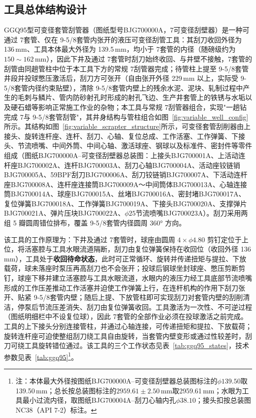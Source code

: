 \subsection{工具总体结构设计}
\label{kebianjingguaguan}
GGQ95型可变径套管刮管器（图纸型号BJG700000A，7\inch 可变径刮壁器）是一种可通过 7\inch 套管、仅在 9-5/8\inch 套管内张开的液压可变径刮管工具：其刮刀收回外径为 136\,mm、工具本体最大外径为 139.5\,mm，均小于 7\inch 套管的内径（随磅级约为 $150\sim162$\,mm），因此下井及通过 7\inch 套管时刮刀始终收回、与井壁不接触，7\inch 套管的刮管由同趟管柱中位于本工具下方的常规 7\inch 刮管器完成；待管柱上提至 9-5/8\inch 套管井段并投球憋压激活后，刮刀方可张开（自由张开外径 229\,mm 以上，实际受 9-5/8\inch 套管内径约束贴壁），清除 9-5/8\inch 套管内壁上的残余水泥、泥块、轧制过程中产生的毛刺与鳞片、管内防砂射孔时形成的射孔飞边、生产井套管上的铁锈与水垢以及硬石蜡等影响正常施工作业的杂物；本工具与常规 7\inch 刮管器组合，实现"一趟钻完成 7\inch 与 9-5/8\inch 套管刮管"，其井身结构与管柱组合如图~\ref{fig:variable_well_config}所示。其结构如图~\ref{fig:variable_scrapter_structure}所示，可变径套管刮削器由上接头、旋转连杆座、连杆、刮刀、心轴、复位总成、工作活塞、工作弹簧、下接头、节流喷嘴、中间外筒、中间心轴、激活球座、钢球以及标准件、密封件等零件组成（图纸BJG700000A--可变径刮壁器总装图：上接头BJG700001A、上活动连杆座BJG700002A、连杆BJG700003A、刮刀心轴BJG700004A、活动座铰链销BJG700005A、59BPF刮刀BJG700006A、刮刀铰链销BJG700007A、下活动连杆座BJG700008A、连杆座连接筒BJG700009A～中间筒体BJG700013A、心轴连接筒BJG700014A、球座BJG700015A、丝堵BJG700016A、密封堵BJG700017A、复位弹簧BJG700018A、工作弹簧BJG700019A、下接头BJG700020A、支撑弹片BJG700021A、弹片压块BJG700022A、$\phi 25$节流喷嘴BJG700023A）。刮刀采用两组 5 瓣圆周错位排布，覆盖 9-5/8\inch 套管内径圆周 360° 方向。

该工具的工作原理为：下井及通过 7\inch 套管时，球座由圆周 $4\times\phi 4.80$ 剪钉定位于上位，将活塞腔与工具水眼流道隔断，刮刀由复位弹簧保持在收回位（收回外径 136\,mm），工具处于\textbf{收回待命状态}，此时可正常循环、旋转并传递扭矩与提拉、下放载荷，球未落座时泵压再高刮刀也不会张开；投球后钢球坐封球座、憋压剪断剪钉，球座下移并建立活塞腔与工具水眼流道，水眼内的液压力经工具底部节流喷嘴形成的工作压差推动工作活塞并迫使工作弹簧上行，在连杆机构的作用下刮刀张开、贴紧 9-5/8\inch 套管内壁；随后上提、下放管柱即可实现刮刀对套管内壁的刮削清洁，停泵后节流压差消失、刮刀由复位弹簧收回。工具激活为一次性、不可逆过程（图纸明细栏中不设复位球），因此 7\inch 套管的全部作业必须在投球激活之前完成。工具的上下接头分别连接管柱，并通过心轴连接，可传递扭矩和提拉、下放载荷；旋转连杆座可迫使整组刮刀绕工具自由旋转，当套管内壁变形或通过性较差时，刮刀可绕工具旋转错位通过。该工具的三个工作状态见表~\ref{tab:ggq95_states}，技术参数见表~\ref{tab:ggq95}\footnote{注：本体最大外径按图纸BJG700000A--可变径刮壁器总装图标注的$\phi 139.50$取139.50\,mm；总长按总装图标注的$2959.61\pm 2.50\,\text{mm}$取2959.61\,mm；水眼为工具最小过流内径，取图纸BJG700004A--刮刀心轴内孔$\phi 38.10$；接头扣按总装图NC38（API 7-2）标注。}。

